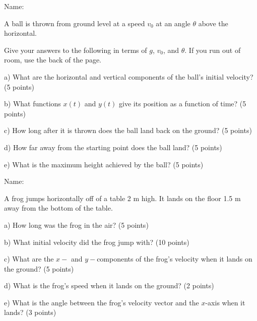\documentclass[12pt]{article}
\begin{document}
\newpage

\begin{flushright}
Name: \underline{\hspace{3in}}
        \end{flushright}

        \Large \centerline{}
        \normalsize
        \rm

A ball is thrown from ground level at a speed $v_0$ at an angle $\theta$ above the horizontal.

\bigskip

Give your answers to the following in terms of $g$, $v_0$, and $\theta$. If you run out of room, use the back of the page.

\it \bigskip

a) What are the horizontal and vertical components of the ball's initial velocity? (5 points)

\vspace{1in}

b) What functions $x(t)$ and $y(t)$ give its position as a function of time? (5 points)

\vspace{1in}

c) How long after it is thrown does the ball land back on the ground? (5 points)

\vspace{1in}

d) How far away from the starting point does the ball land? (5 points)

\vspace{1in}

e) What is the maximum height achieved by the ball? (5 points)

\newpage


\begin{flushright}
Name: \underline{\hspace{3in}}
        \end{flushright}

        \Large \centerline{}
        \normalsize
        \rm

A frog jumps horizontally off of a table 2 m high. It lands on the floor 1.5 m away from the bottom of the table.

\it \bigskip

a) How long was the frog in the air? (5 points)

\vspace{1.2in}

b) What initial velocity did the frog jump with? (10 points)

\vspace{1.2in}

c) What are the $x-$ and $y-$components of the frog's velocity when it lands on the ground? (5 points)

\vspace{1.2in}

d) What is the frog's speed when it lands on the ground? (2 points)

\vspace{1in}

e) What is the angle between the frog's velocity vector and the $x$-axis when it lands? (3 points)

\bigskip
\end{document}

